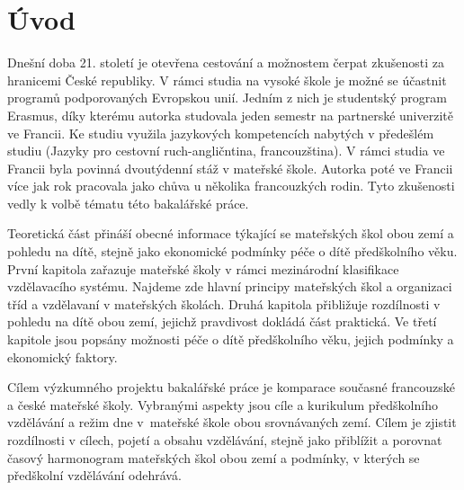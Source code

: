 \setcounter{page}{1}
\chapter*{Úvod}
Dnešní doba 21. století je otevřena cestování a možnostem čerpat zkušenosti za hranicemi České republiky. V rámci studia na vysoké škole je možné se účastnit programů podporovaných Evropskou unií. Jedním z nich je studentský program Erasmus, díky kterému autorka studovala jeden semestr na partnerské univerzitě ve Francii. Ke studiu využila jazykových kompetencích nabytých v předešlém studiu (Jazyky pro cestovní ruch-angličntina, francouzština). V rámci studia ve Francii byla povinná dvoutýdenní stáž v mateřské škole. Autorka poté ve Francii více jak rok pracovala jako chůva u několika francouzkých rodin. Tyto zkušenosti vedly k volbě tématu této bakalářské práce. 

Teoretická část přináší obecné informace týkající se mateřských škol obou zemí a pohledu na dítě, stejně jako ekonomické podmínky péče o dítě předškolního věku. První kapitola zařazuje mateřské školy v rámci mezinárodní klasifikace vzdělavacího systému. Najdeme zde hlavní principy mateřských škol a organizaci tříd a vzdělavaní v mateřských školách. Druhá kapitola přibližuje rozdílnosti v pohledu na dítě obou zemí, jejichž pravdivost dokládá část praktická. Ve třetí kapitole jsou popsány možnosti péče o dítě předškolního věku, jejich podmínky a ekonomický faktory. 

Cílem výzkumného projektu bakalářské práce je komparace současné francouzské a české mateřské školy. Vybranými aspekty jsou cíle a kurikulum předškolního vzdělávání a režim dne v mateřské škole obou srovnávaných zemí. Cílem je zjistit rozdílnosti v cílech, pojetí a obsahu vzdělávání, stejně jako přiblížit a porovnat časový harmonogram mateřských škol obou zemí a podmínky, v kterých se předškolní vzdělávání odehrává. 

